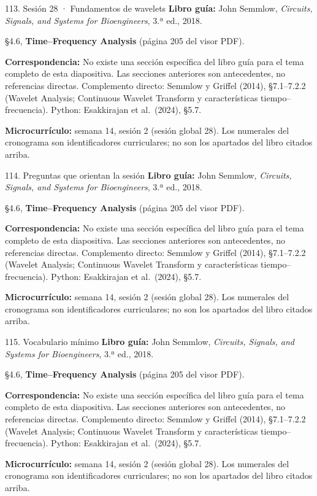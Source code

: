 \documentclass[
  10pt,
  ignorenonframetext,
  aspectratio=169,
  spanish,
]{beamer}
\begin{document}
\begin{frame}{113. Sesión 28 · Fundamentos de wavelets}
\label{sesiuxf3n-28-fundamentos-de-wavelets}
\textbf{Libro guía:} John Semmlow, \emph{Circuits, Signals, and Systems
for Bioengineers}, 3.ª ed., 2018.

§4.6, \textbf{Time--Frequency Analysis} (página 205 del visor PDF).

\textbf{Correspondencia:} No existe una sección específica del libro
guía para el tema completo de esta diapositiva. Las secciones anteriores
son antecedentes, no referencias directas. Complemento directo: Semmlow
y Griffel (2014), §7.1--7.2.2 (Wavelet Analysis; Continuous Wavelet
Transform y características tiempo--frecuencia). Python: Esakkirajan et
al.~(2024), §5.7.

\textbf{Microcurrículo:} semana 14, sesión 2 (sesión global 28). Los
numerales del cronograma son identificadores curriculares; no son los
apartados del libro citados arriba.
\end{frame}

\begin{frame}{114. Preguntas que orientan la sesión}
\label{preguntas-que-orientan-la-sesiuxf3n-7}
\textbf{Libro guía:} John Semmlow, \emph{Circuits, Signals, and Systems
for Bioengineers}, 3.ª ed., 2018.

§4.6, \textbf{Time--Frequency Analysis} (página 205 del visor PDF).

\textbf{Correspondencia:} No existe una sección específica del libro
guía para el tema completo de esta diapositiva. Las secciones anteriores
son antecedentes, no referencias directas. Complemento directo: Semmlow
y Griffel (2014), §7.1--7.2.2 (Wavelet Analysis; Continuous Wavelet
Transform y características tiempo--frecuencia). Python: Esakkirajan et
al.~(2024), §5.7.

\textbf{Microcurrículo:} semana 14, sesión 2 (sesión global 28). Los
numerales del cronograma son identificadores curriculares; no son los
apartados del libro citados arriba.
\end{frame}

\begin{frame}{115. Vocabulario mínimo}
\label{vocabulario-muxednimo-7}
\textbf{Libro guía:} John Semmlow, \emph{Circuits, Signals, and Systems
for Bioengineers}, 3.ª ed., 2018.

§4.6, \textbf{Time--Frequency Analysis} (página 205 del visor PDF).

\textbf{Correspondencia:} No existe una sección específica del libro
guía para el tema completo de esta diapositiva. Las secciones anteriores
son antecedentes, no referencias directas. Complemento directo: Semmlow
y Griffel (2014), §7.1--7.2.2 (Wavelet Analysis; Continuous Wavelet
Transform y características tiempo--frecuencia). Python: Esakkirajan et
al.~(2024), §5.7.

\textbf{Microcurrículo:} semana 14, sesión 2 (sesión global 28). Los
numerales del cronograma son identificadores curriculares; no son los
apartados del libro citados arriba.
\end{frame}
\end{document}

